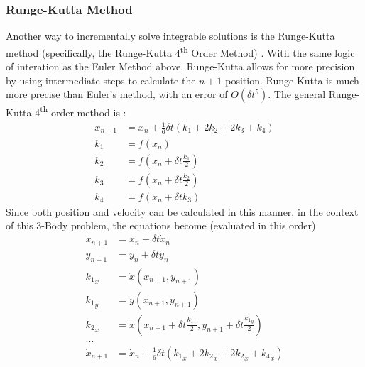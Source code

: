 \documentclass[preprint,titlepage,preprintnumbers,amsmath,amssymb,aps,11pt]{revtex4-2}
\begin{document}
\subsubsection{Runge-Kutta Method}\label{sec:rungekutta}
Another way to incrementally solve integrable solutions is the Runge-Kutta method (specifically, the Runge-Kutta 4\textsuperscript{th} Order Method) \cite{Musielak_2014}. With the same logic of interation as the Euler Method above, Runge-Kutta allows for more precision by using intermediate steps to calculate the $n+1$ position. Runge-Kutta is much more precise than Euler's method, with an error of $O(\delta t^5)$. The general Runge-Kutta 4\textsuperscript{th} order method is \cite[p. 21]{Musielak_2014}:
\begin{equation}
    \begin{aligned}
        x_{n+1} & =x_n+\frac{1}{6}\delta t(k_1+2k_2+2k_3+k_4) \\
        k_1     & =f(x_n)                                     \\
        k_2     & =f(x_n+\delta t\frac{k_1}{2})               \\
        k_3     & =f(x_n+\delta t\frac{k_2}{2})               \\
        k_4     & =f(x_n+\delta tk_3)
    \end{aligned}
    \label{eq:rungekutta}
\end{equation}
Since both position and velocity can be calculated in this manner, in the context of this 3-Body problem, the equations become (evaluated in this order)
\begin{equation}
    \begin{aligned}
        x_{n+1}       & = x_n + \delta t\dot{x}_n                                                          \\
        y_{n+1}       & = y_n + \delta t\dot{y}_n                                                          \\
        {k_1}_x       & = \ddot{x}(x_{n+1},y_{n+1})                                                        \\
        {k_1}_y       & = \ddot{y}(x_{n+1},y_{n+1})                                                        \\
        {k_2}_x       & = \ddot{x}(x_{n+1}+ \delta t \frac{{k_1}_x}{2}, y_{n+1}+\delta t\frac{{k_1}_y}{2}) \\
        ...                                                                                                \\
        \dot{x}_{n+1} & = \dot{x}_n + \frac{1}{6}\delta t({k_1}_x+2{k_2}_x+2{k_2}_x+{k_4}_x)
    \end{aligned}
    \label{eq:rungekutta-3bp}
\end{equation}
\end{document}
